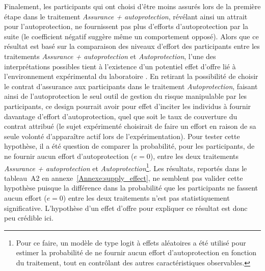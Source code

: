 \begin{Article}
\begin{refsection}[Mouminoux]
Finalement, les participants qui ont choisi d'être moins assurés lors de la première étape dans le traitement \textit{Assurance + autoprotection}, révélant ainsi un attrait pour l'autoprotection, ne fournissent pas plus d'efforts d'autoprotection par la suite (le coefficient négatif suggère même un comportement opposé). Alors que ce résultat est basé sur la comparaison des niveaux d'effort des participants entre les traitements \textit{Assurance + autoprotection} et \textit{Autoprotection}, l'une des interprétations possibles tient à l'existence d'un potentiel effet d'offre lié à l'environnement expérimental du laboratoire \parencite{clv10}. En retirant la possibilité de choisir le contrat d'assurance aux participants dans le traitement \textit{Autoprotection}, faisant ainsi de l'autoprotection le seul outil de gestion du risque manipulable par les participants, ce design pourrait avoir pour effet d’inciter les individus à fournir davantage d’effort d'autoprotection, quel que soit le taux de couverture du contrat attribué (le sujet expérimenté choisirait de faire un effort en raison de sa seule volonté d'apparaître actif lors de l’expérimentation). Pour tester cette hypothèse, il a été question de comparer la probabilité, pour les participants, de ne fournir aucun effort d'autoprotection ($e=0$), entre les deux traitements \textit{Assurance + autoprotection} et \textit{Autoprotection}\footnote{Pour ce faire, un modèle de type logit à effets aléatoires a été utilisé pour estimer la probabilité de ne fournir aucun effort d'autoprotection en fonction du traitement, tout en contrôlant des autres caractéristiques observables.}. Les résultats, reportés dans le tableau~A2 en annexe~\ref{Annexe:supply_effect}, ne semblent pas
valider cette hypothèse puisque la différence dans la probabilité que les participants ne fassent aucun effort ($e = 0$) entre les deux traitements n'est pas statistiquement significative. L’hypothèse d’un  effet d'offre pour expliquer ce résultat est donc peu crédible ici.


\end{refsection}
\end{Article}
